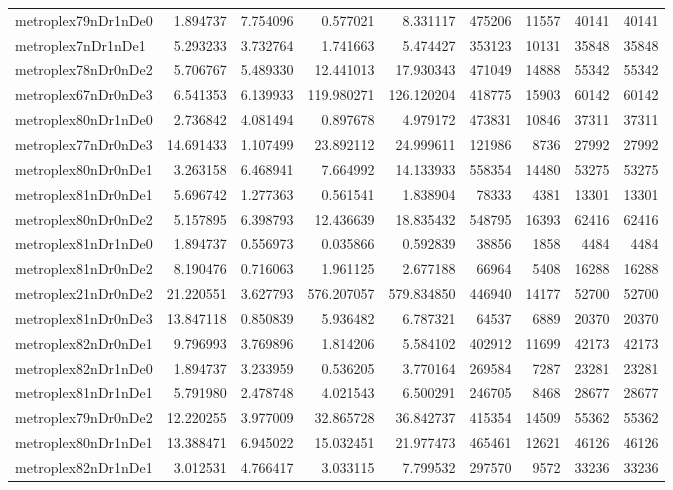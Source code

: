 \begin{longtable}{|l|r|r|r|r|r|r|r|r|}
metroplex79nDr1nDe0 & 1.894737 & 7.754096 & 0.577021 & 8.331117 & 475206 & 11557 & 40141 & 40141 \\
metroplex7nDr1nDe1 & 5.293233 & 3.732764 & 1.741663 & 5.474427 & 353123 & 10131 & 35848 & 35848 \\
metroplex78nDr0nDe2 & 5.706767 & 5.489330 & 12.441013 & 17.930343 & 471049 & 14888 & 55342 & 55342 \\
metroplex67nDr0nDe3 & 6.541353 & 6.139933 & 119.980271 & 126.120204 & 418775 & 15903 & 60142 & 60142 \\
metroplex80nDr1nDe0 & 2.736842 & 4.081494 & 0.897678 & 4.979172 & 473831 & 10846 & 37311 & 37311 \\
metroplex77nDr0nDe3 & 14.691433 & 1.107499 & 23.892112 & 24.999611 & 121986 & 8736 & 27992 & 27992 \\
metroplex80nDr0nDe1 & 3.263158 & 6.468941 & 7.664992 & 14.133933 & 558354 & 14480 & 53275 & 53275 \\
metroplex81nDr0nDe1 & 5.696742 & 1.277363 & 0.561541 & 1.838904 & 78333 & 4381 & 13301 & 13301 \\
metroplex80nDr0nDe2 & 5.157895 & 6.398793 & 12.436639 & 18.835432 & 548795 & 16393 & 62416 & 62416 \\
metroplex81nDr1nDe0 & 1.894737 & 0.556973 & 0.035866 & 0.592839 & 38856 & 1858 & 4484 & 4484 \\
metroplex81nDr0nDe2 & 8.190476 & 0.716063 & 1.961125 & 2.677188 & 66964 & 5408 & 16288 & 16288 \\
metroplex21nDr0nDe2 & 21.220551 & 3.627793 & 576.207057 & 579.834850 & 446940 & 14177 & 52700 & 52700 \\
metroplex81nDr0nDe3 & 13.847118 & 0.850839 & 5.936482 & 6.787321 & 64537 & 6889 & 20370 & 20370 \\
metroplex82nDr0nDe1 & 9.796993 & 3.769896 & 1.814206 & 5.584102 & 402912 & 11699 & 42173 & 42173 \\
metroplex82nDr1nDe0 & 1.894737 & 3.233959 & 0.536205 & 3.770164 & 269584 & 7287 & 23281 & 23281 \\
metroplex81nDr1nDe1 & 5.791980 & 2.478748 & 4.021543 & 6.500291 & 246705 & 8468 & 28677 & 28677 \\
metroplex79nDr0nDe2 & 12.220255 & 3.977009 & 32.865728 & 36.842737 & 415354 & 14509 & 55362 & 55362 \\
metroplex80nDr1nDe1 & 13.388471 & 6.945022 & 15.032451 & 21.977473 & 465461 & 12621 & 46126 & 46126 \\
metroplex82nDr1nDe1 & 3.012531 & 4.766417 & 3.033115 & 7.799532 & 297570 & 9572 & 33236 & 33236 \\

\end{longtable}
